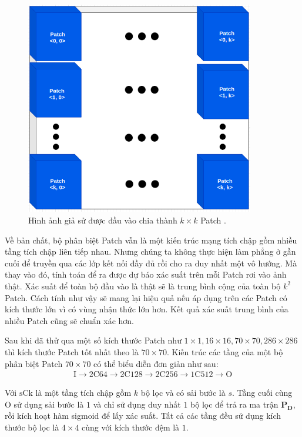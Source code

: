 \documentclass[a4paper, 12pt]{report}
\begin{document}
\begin{figure}[!h]
\captionsetup{width=0.8\textwidth}
\centering
\includegraphics[width=10cm]{images/patch.png}
\caption{Hình ảnh giả sử được đầu vào chia thành $k\times k$ Patch \cite{khanhpix2pix2020}.}
\label{fig:patchganarchitecture}
\end{figure}

Về bản chất, bộ phân biệt Patch vẫn là một kiến trúc mạng tích chập gồm nhiều tầng tích chập liên tiếp nhau.
Nhưng chúng ta không thực hiện làm phẳng ở gần cuối để truyền qua các lớp kết nối đầy đủ rồi cho ra duy nhất một vô hướng.
Mà thay vào đó, tính toán để ra được dự báo xác suất trên mỗi Patch rơi vào ảnh thật.
Xác suất để toàn bộ đầu vào là thật sẽ là trung bình cộng của toàn bộ $k^2$ Patch.
Cách tính như vậy sẽ mang lại hiệu quả nếu áp dụng trên các Patch có kích thước lớn vì có vùng nhận thức lớn hơn.
Kết quả xác suất trung bình của nhiều Patch cũng sẽ chuẩn xác hơn.\vspace{5pt}

Sau khi đã thử qua một số kích thước Patch như $1\times 1, 16\times 16, 70\times 70, 286\times 286$ thì kích thước Patch tốt nhất theo \cite{isola2018imagetoimage} là $70 \times 70$.
Kiến trúc các tầng của một bộ phân biệt Patch $70\times 70$ có thể biểu diễn đơn giản như sau:
\begin{align}
    \text{I} \rightarrow \text{2C64} \rightarrow \text{2C128} \rightarrow \text{2C256} \rightarrow \text{1C512} \rightarrow \text{O}\label{eqn:disarchitecture}
\end{align}

Với $\text{sCk}$ là một tầng tích chập gồm $k$ bộ lọc và có sải bước là $s$.
Tầng cuối cùng $\text{O}$ sử dụng sải bước là $1$ và chỉ sử dụng duy nhất $1$ bộ lọc để trả ra ma trận $\mathbf{P_D}$, rồi kích hoạt hàm sigmoid để lấy xác suất.
Tất cả các tầng đều sử dụng kích thước bộ lọc là $4 \times 4$ cùng với kích thước đệm là $1$.
\end{document}

